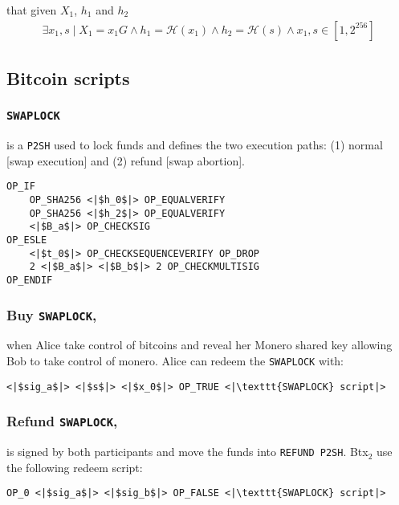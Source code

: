\documentclass{llncs}
\begin{document}
that given $X_1$, $h_1$ and $h_2$
\begin{equation}
\begin{split}
    \exists x_1, s \mid X_1 = x_1G \land h_1 = \mathcal{H}(x_1) \land h_2 = \mathcal{H}(s) \land x_1, s \in [1, 2^{256}]
\end{split}
\end{equation}

\subsection{Bitcoin scripts}

\subsubsection{\texttt{SWAPLOCK}}
is a \texttt{P2SH} used to lock funds and defines the two execution paths: (1) normal [swap execution] and (2) refund [swap abortion].

\begin{verbatim}
OP_IF
    OP_SHA256 <|$h_0$|> OP_EQUALVERIFY
    OP_SHA256 <|$h_2$|> OP_EQUALVERIFY
    <|$B_a$|> OP_CHECKSIG
OP_ESLE
    <|$t_0$|> OP_CHECKSEQUENCEVERIFY OP_DROP
    2 <|$B_a$|> <|$B_b$|> 2 OP_CHECKMULTISIG
OP_ENDIF
\end{verbatim}

\subsubsection{Buy \texttt{SWAPLOCK},}
when Alice take control of bitcoins and reveal her Monero shared key allowing Bob to take control of monero. Alice can redeem the \texttt{SWAPLOCK} with:

\begin{verbatim}
<|$sig_a$|> <|$s$|> <|$x_0$|> OP_TRUE <|\texttt{SWAPLOCK} script|>
\end{verbatim}

\subsubsection{Refund \texttt{SWAPLOCK},}
is signed by both participants and move the funds into \texttt{REFUND P2SH}. Btx$_2$ use the following redeem script:

\begin{verbatim}
OP_0 <|$sig_a$|> <|$sig_b$|> OP_FALSE <|\texttt{SWAPLOCK} script|>
\end{verbatim}
\end{document}
